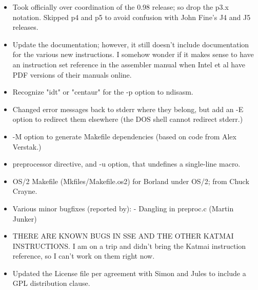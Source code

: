 
\begin{itemize}
    \item{Took officially over coordination of the 0.98 release; so drop
        the p3.x notation. Skipped p4 and p5 to avoid confusion with John
        Fine's J4 and J5 releases.}
    \item{Update the documentation; however, it still doesn't include
        documentation for the various new instructions. I somehow wonder if
        it makes sense to have an instruction set reference in the assembler
        manual when Intel et al have PDF versions of their manuals online.}
    \item{Recognize "idt" or "centaur" for the -p option to ndisasm.}
    \item{Changed error messages back to stderr where they belong, but add an
        -E option to redirect them elsewhere (the DOS shell cannot redirect
        stderr.)}
    \item{-M option to generate Makefile dependencies (based on code from Alex Verstak.)}
    \item{ preprocessor directive, and -u option, that undefines a
        single-line macro.}
    \item{OS/2 Makefile (Mkfiles/Makefile.os2) for Borland under OS/2; from
        Chuck Crayne.}
    \item{Various minor bugfixes (reported by):
        - Dangling  in preproc.c (Martin Junker)}
    \item{THERE ARE KNOWN BUGS IN SSE AND THE OTHER KATMAI INSTRUCTIONS. I am
        on a trip and didn't bring the Katmai instruction reference, so I
        can't work on them right now.}
    \item{Updated the License file per agreement with Simon and Jules to
        include a GPL distribution clause.}
\end{itemize}


